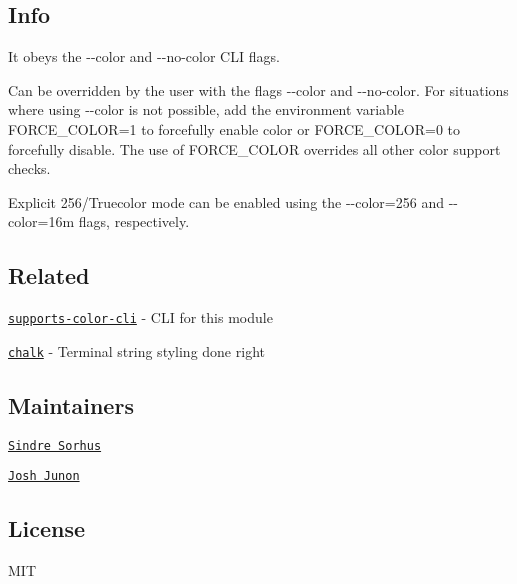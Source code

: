 \subsection*{Info}

It obeys the {\ttfamily -\/-\/color} and {\ttfamily -\/-\/no-\/color} C\+LI flags.

Can be overridden by the user with the flags {\ttfamily -\/-\/color} and {\ttfamily -\/-\/no-\/color}. For situations where using {\ttfamily -\/-\/color} is not possible, add the environment variable {\ttfamily F\+O\+R\+C\+E\+\_\+\+C\+O\+L\+OR=1} to forcefully enable color or {\ttfamily F\+O\+R\+C\+E\+\_\+\+C\+O\+L\+OR=0} to forcefully disable. The use of {\ttfamily F\+O\+R\+C\+E\+\_\+\+C\+O\+L\+OR} overrides all other color support checks.

Explicit 256/\+Truecolor mode can be enabled using the {\ttfamily -\/-\/color=256} and {\ttfamily -\/-\/color=16m} flags, respectively.

\subsection*{Related}


\begin{DoxyItemize}
\item \href{https://github.com/chalk/supports-color-cli}{\tt supports-\/color-\/cli} -\/ C\+LI for this module
\item \href{https://github.com/chalk/chalk}{\tt chalk} -\/ Terminal string styling done right
\end{DoxyItemize}

\subsection*{Maintainers}


\begin{DoxyItemize}
\item \href{https://github.com/sindresorhus}{\tt Sindre Sorhus}
\item \href{https://github.com/qix-}{\tt Josh Junon}
\end{DoxyItemize}

\subsection*{License}

M\+IT 